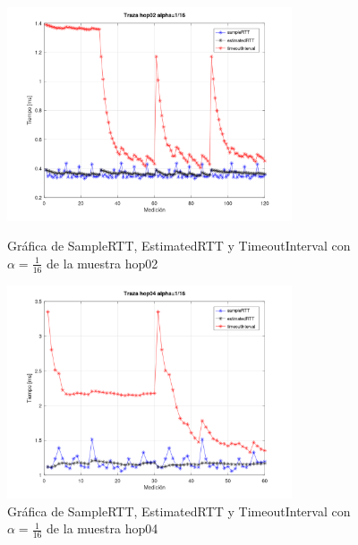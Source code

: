 \begin{figure}[H]
    \centering
    \includegraphics[width=0.75\textwidth]{img/alpha116/trazaHop02.png} 
    \caption{Gráfica de SampleRTT, EstimatedRTT y TimeoutInterval con \( \alpha = \frac{1}{16} \)
    de la muestra hop02}

    \includegraphics[width=0.75\textwidth]{img/alpha116/trazaHop04.png} 
    \caption{Gráfica de SampleRTT, EstimatedRTT y TimeoutInterval con \( \alpha = \frac{1}{16} \)
    de la muestra hop04}
    \label{fig:alpha2_p1}
\end{figure}
\newpage
